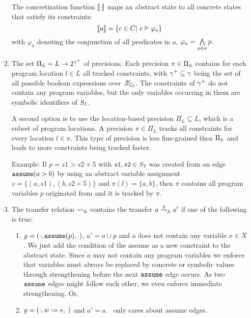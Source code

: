 \begin{enumerate}[leftmargin=*,label=\arabic*.]
	The concretization function $\llbracket \cdot \rrbracket$ maps an abstract state to all concrete states that satisfy its constraints:
	\[ \llbracket a \rrbracket = \{ c \in C |\ c \vDash \varphi_a \} \]
	with $\varphi_a$ denoting the conjunction of all predicates in $a$, $\varphi_a = \bigwedge\limits_{p \in a} p$.

\item
The set $\Pi_{\mathbb{A}} = L \rightarrow 2^{{\gamma^+}}$ of precisions. Each precision $\pi \in \Pi_{\mathbb{A}}$ contains for each program location $l \in L$ all tracked constraints, with ${\gamma^+} \subseteq \gamma$ being the set of all possible boolean expressions over ${\mathscr{Z}_{\mathbb{C_{S}}}}$.
The constraints of ${\gamma^+}$ do not contain any program variables, but the only variables occurring in them are symbolic identifiers of $S_I$.

A second option is to use the location-based precision $\Pi_L \subseteq L$, which is a subset of program locations.
A precision $\pi \in \Pi_L$ tracks all constraints for every location $l \in \pi$.
This type of precision is less fine-grained then $\Pi_{\mathbb{A}}$ and leads to more constraints being tracked faster.

Example: If $p = s1 > s2 + 5$ with $s1, s2 \in S_I$ was created from an edge $\texttt{assume}(a > b)$ by using an abstract variable assignment $v = \{ (a, s1), (b, s2 + 5) \}$
and $\pi(l) = \{ a, b \}$, then $\pi$ contains all program variables $p$ originated from and it is tracked by $\pi$. 

\item The transfer relation $\rightsquigarrow_{\mathbb{A}}$ contains the transfer $a \overset{g}{\rightsquigarrow}_{\mathbb{A}} a'$ if one of the following is true:
	\begin{enumerate}[label=\alph*)]
		\item $g = (\cdot, \texttt{assume}(p), \cdot)$, $a' = a \cup p$ and
			$a$ does not contain any variable $x \in X$.
			We just add the condition of the assume as a new constraint to the abstract state.
			Since $a$ may not contain any program variables we enforce that
			variables must always be replaced by concrete or symbolic values through strengthening before the next $\texttt{assume}$ edge occurs.
			As two $\texttt{assume}$ edges might follow each other, we even enforce immediate strengthening.
			Or,
		\item $g = (\cdot, w := e, \cdot)$ and $a' = a$. \ConstraintsCPA\ only cares about assume edges.
	\end{enumerate}
	

\end{enumerate}
